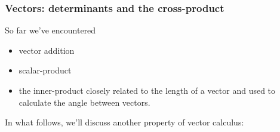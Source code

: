 \documentclass{beamer}
\begin{document}


\begin{frame}
\frametitle{Vectors: determinants and the cross-product}
So far we've encountered
\begin{itemize}
\item vector addition
\item scalar-product
\item the inner-product closely related to the length of a vector and used to calculate the angle between vectors.
\end{itemize}
In what follows, we'll discuss another property of vector calculus: {}

\end{frame}
\end{document}
